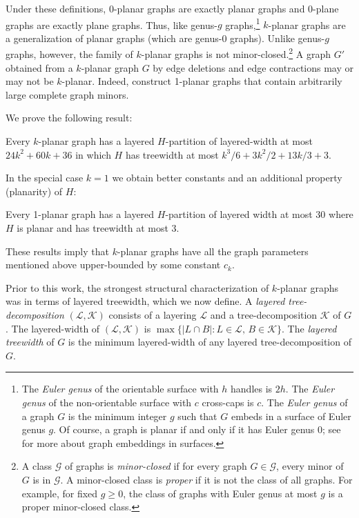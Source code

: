 \documentclass{patmorin}
\newcommand{\treewidth}{\ensuremath{k^3/6 + 3k^2/2 + 13k/3 + 3}}
\begin{document}
Under these definitions, $0$-planar graphs are exactly planar graphs and $0$-plane graphs are exactly plane graphs. Thus, like genus-$g$ graphs,\footnote{The \textit{Euler genus} of the orientable surface with $h$ handles is $2h$. The \textit{Euler genus} of the non-orientable surface with $c$ cross-caps is $c$. The \textit{Euler genus} of a graph $G$ is the minimum integer $g$ such that $G$ embeds in a surface of Euler genus $g$. Of course, a graph is planar if and only if it has Euler genus 0; see \citep{mohar.thomassen:graphs} for more about graph embeddings in surfaces.} $k$-planar graphs are a generalization of planar graphs (which are genus-$0$ graphs).  Unlike genus-$g$ graphs, however, the family of $k$-planar graphs is not minor-closed.\footnote{A class $\mathcal{G}$ of graphs is \emph{minor-closed} if for every graph $G\in\mathcal{G}$, every minor of $G$ is in $\mathcal{G}$. A minor-closed class is \emph{proper} if it is not the class of all graphs. For example, for fixed $g\geq 0$, the class of graphs with Euler genus at most $g$ is a proper minor-closed class.}  A graph $G'$ obtained from a $k$-planar graph $G$ by edge deletions and edge contractions may or may not be $k$-planar. Indeed, \citet{dujmovic.eppstein.ea:structure} construct 1-planar graphs that contain arbitrarily large complete graph minors.

We prove the following result:
\begin{thm}
  Every $k$-planar graph has a layered $H$-partition of layered-width at most $24k^2 + 60k + 36$ in which $H$ has treewidth at most $\treewidth$.
\end{thm}

In the special case $k=1$ we obtain better constants and an additional property (planarity) of $H$:

\begin{thm}
  Every 1-planar graph has a layered $H$-partition of layered width at most 30 where $H$ is planar and has treewidth at most 3.
\end{thm}

These results imply that $k$-planar graphs have all the graph parameters mentioned above upper-bounded by some constant $c_k$.

Prior to this work, the strongest structural characterization of $k$-planar graphs was in terms of layered treewidth, which we now define.  A \emph{layered tree-decomposition} $(\mathcal{L},\mathcal{K})$ consists of a layering $\mathcal{L}$ and a tree-decomposition $\mathcal{K}$ of $G$. The layered-width of $(\mathcal{L},\mathcal{K})$ is $\max\{|L\cap B|: L\in \mathcal{L},\, B\in \mathcal{K}\}$.  The \emph{layered treewidth} of $G$ is the minimum layered-width of any layered tree-decomposition of $G$.
\end{document}
